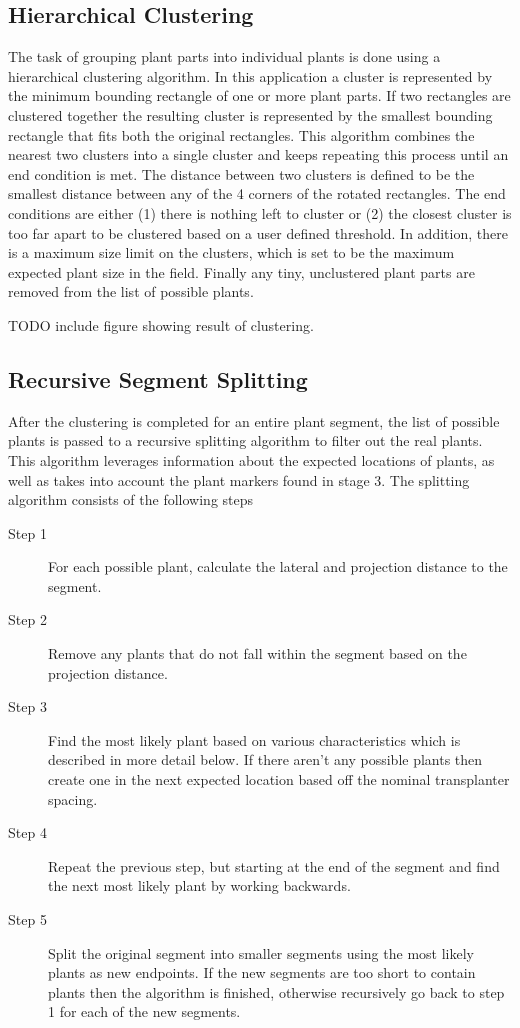 \subsection{Hierarchical Clustering}

The task of grouping plant parts into individual plants is done using a hierarchical clustering algorithm.  In this application a cluster is represented by the minimum bounding rectangle of one or more plant parts.  If two rectangles are clustered together the resulting cluster is represented by the smallest bounding rectangle that fits both the original rectangles.  This algorithm combines the nearest two clusters into a single cluster and keeps repeating this process until an end condition is met.  The distance between two clusters is defined to be the smallest distance between any of the 4 corners of the rotated rectangles.   The end conditions are either (1) there is nothing left to cluster or (2) the closest cluster is too far apart to be clustered based on a user defined threshold.  In addition, there is a maximum size limit on the clusters, which is set to be the maximum expected plant size in the field.  Finally any tiny, unclustered plant parts are removed from the list of possible plants. 

TODO include figure showing result of clustering.

\subsection{Recursive Segment Splitting}

After the clustering is completed for an entire plant segment, the list of possible plants is passed to a recursive splitting algorithm to filter out the real plants.  This algorithm leverages information about the expected locations of plants, as well as takes into account the plant markers found in stage 3.  The splitting algorithm consists of the following steps

\begin{description}
\item[Step 1] For each possible plant, calculate the lateral and projection distance to the segment.  
\item[Step 2] Remove any plants that do not fall within the segment based on the projection distance.
\item[Step 3] Find the most likely plant based on various characteristics which is described in more detail below.  If there aren't any possible plants then create one in the next expected location based off the nominal transplanter spacing.  
\item[Step 4] Repeat the previous step, but starting at the end of the segment and find the next most likely plant by working backwards.
\item[Step 5] Split the original segment into smaller segments using the most likely plants as new endpoints.  If the new segments are too short to contain plants then the algorithm is finished, otherwise recursively go back to step 1 for each of the new segments.
\end{description}

